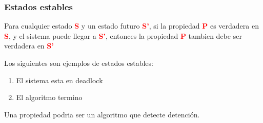 \subsubsection{Estados estables}

Para cualquier estado \textcolor{red}{\textbf{S}} y un estado futuro \textcolor{red}{\textbf{S'}}, si la propiedad \textcolor{red}{\textbf{P}} es verdadera en \textcolor{red}{\textbf{S}}, y el sistema puede llegar a \textcolor{red}{\textbf{S'}}, entonces la propiedad \textcolor{red}{\textbf{P}} tambien debe ser verdadera en \textcolor{red}{\textbf{S'}}

Los siguientes son ejemplos de estados estables:
\begin{center}
  \begin{enumerate}
    \item El sistema esta en deadlock
    \item El algoritmo termino
  \end{enumerate}
\end{center}
Una propiedad podria ser un algoritmo que detecte detención.